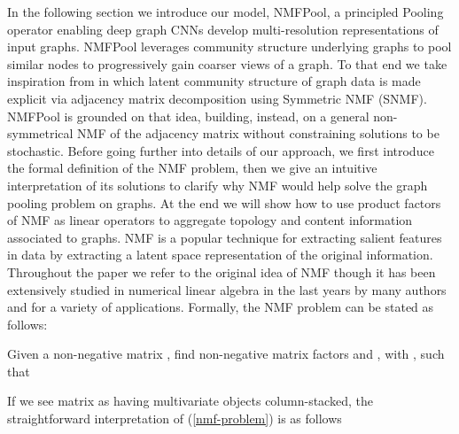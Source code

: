 \documentclass[runningheads]{llncs}
\begin{document}
In the following section we introduce our model, NMFPool, a principled Pooling operator enabling deep graph CNNs develop multi-resolution representations of input graphs. NMFPool leverages community structure underlying graphs to pool similar nodes to progressively gain coarser views of a graph. To that end we take inspiration from \cite{NIPS2005_2948} in which latent community structure of graph data is made explicit via adjacency matrix decomposition using Symmetric NMF (SNMF). NMFPool is grounded on that idea, building, instead, on a general non-symmetrical NMF of the adjacency matrix without constraining solutions to be stochastic. Before going further into details of our approach, we first introduce the formal definition of the NMF problem, then we give an intuitive interpretation of its solutions to clarify why NMF would help solve the graph pooling problem on graphs. At the end we will show how to use product factors of NMF as linear operators to aggregate topology and content information associated to graphs.
NMF is a popular technique for extracting salient features in data by extracting a latent space representation of the original information. Throughout the paper we refer to the original idea of NMF \cite{NIPS2000_1861} though it has been extensively studied in numerical linear algebra in the last years by many authors and for a variety of applications. Formally, the NMF problem can be stated as follows:
\begin{definition}
	Given a non-negative matrix , find non-negative matrix factors  and , with , such that
\end{definition}


If we see matrix  as having  multivariate objects column-stacked, the straightforward interpretation of (\ref{nmf-problem}) is as follows
\end{document}

